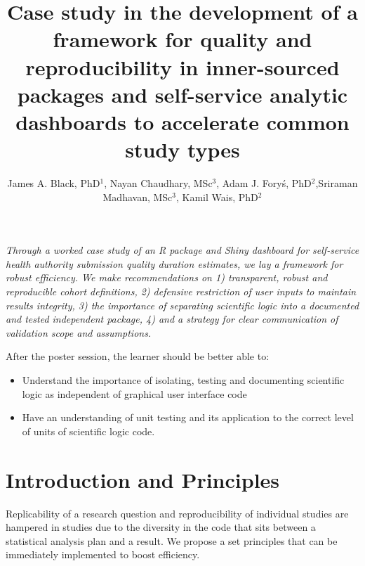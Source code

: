 \documentclass{amia}
\begin{document}

\textit{Through a worked case study of an R package and Shiny dashboard for self-service health authority submission quality duration estimates, we lay a framework for robust efficiency. We make recommendations on 1) transparent, robust and reproducible cohort definitions, 2) defensive restriction of user inputs to maintain results integrity, 3) the importance of separating scientific logic into a documented and tested independent package, 4) and a strategy for clear communication of validation scope and assumptions.}

After the poster session, the learner should be better able to:

\begin{itemize}
  \item Understand the importance of isolating, testing and documenting scientific logic as independent of graphical user interface code
  \item Have an understanding of unit testing and its application to the correct level of units of scientific logic code.
\end{itemize}

\pagebreak

\title{Case study in the development of a framework for quality and reproducibility in inner-sourced packages and self-service analytic dashboards to accelerate common study types}

\author{James A. Black, PhD$^{1}$, Nayan Chaudhary, MSc$^{3}$, Adam J. Foryś, PhD$^{2}$,Sriraman Madhavan, MSc$^{3}$, Kamil Wais, PhD$^{2}$} 


\maketitle

\section*{Introduction and Principles}

Replicability of a research question and reproducibility of individual studies are hampered in studies due to the diversity in the code that sits between a statistical analysis plan and a result. We propose a set principles that can be immediately implemented to boost efficiency. 
\end{document}
